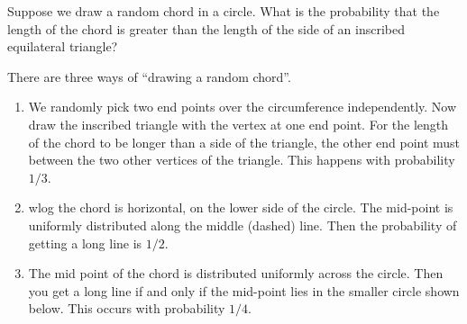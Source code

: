 \documentclass[a4paper]{article}
\begin{document}
\begin{eg}
  Suppose we draw a random chord in a circle. What is the probability that the length of the chord is greater than the length of the side of an inscribed equilateral triangle?

  There are three ways of ``drawing a random chord''.
  \begin{enumerate}
    \item We randomly pick two end points over the circumference independently. Now draw the inscribed triangle with the vertex at one end point. For the length of the chord to be longer than a side of the triangle, the other end point must between the two other vertices of the triangle. This happens with probability $1/3$.
      \begin{center}
      \end{center}
    \item wlog the chord is horizontal, on the lower side of the circle. The mid-point is uniformly distributed along the middle (dashed) line. Then the probability of getting a long line is $1/2$.
      \begin{center}
      \end{center}
    \item The mid point of the chord is distributed uniformly across the circle. Then you get a long line if and only if the mid-point lies in the smaller circle shown below. This occurs with probability $1/4$.
       \begin{center}
\end{center}
\end{enumerate}
\end{eg}
\end{document}
